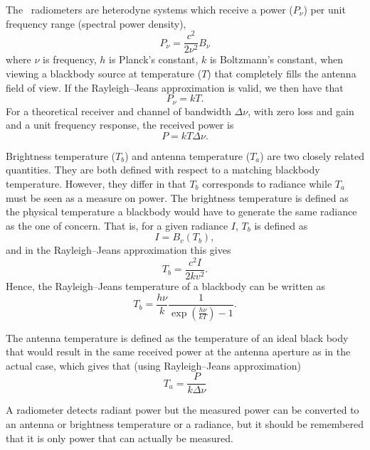 The \smr\ radiometers are heterodyne systems which receive a power (\(P_{\nu}\))
per unit frequency range (spectral power density),
\begin{equation}
P_{\nu} = \frac{c^{2}}{2\nu^{2}}B_{\nu}
\end{equation} 
where \(\nu\) is frequency, \(h\) is Planck's constant, \(k\) is Boltzmann's constant,
when viewing a blackbody source at temperature (\(T\)) that completely
fills the antenna field of view. 
If the Rayleigh--Jeans approximation is valid, we then have that
\begin{equation}
P_{\nu} = kT.
\end{equation}
For a theoretical receiver and channel of bandwidth \(\Delta \nu\), with zero loss and gain 
and a unit frequency response, the received power is
\begin{equation}
 P = kT\Delta \nu.
\end{equation}   

Brightness temperature (\(T_{b}\)) and antenna temperature (\(T_{a}\))
are two closely related quantities. They are both defined with respect to a 
matching blackbody temperature. However, they differ in that \(T_{b}\) corresponds 
to radiance while \(T_{a}\) must be seen as a measure on power.
The brightness temperature is defined as the physical temperature 
a blackbody would have to generate the same radiance as the one of concern.
That is, for a given radiance \(I\), \(T_{b}\) is defined as
\begin{equation}
 I = B_{v}(T_{b}),
\end{equation}
and in the Rayleigh--Jeans approximation this gives
\begin{equation}
 T_{b} = \frac{c^{2}I}{2kv^{2}}.
\end{equation}
Hence, the Rayleigh--Jeans temperature of a blackbody can be written as 
\begin{equation}
 T_{b} = \frac{h\nu}{k}\frac{1}{\exp(\frac{h\nu}{kT})-1}.  
\label{eq:tbrj}
\end{equation}


The antenna temperature is defined as the temperature of an ideal black
body that would result in the same received power at the antenna aperture 
as in the actual case, which gives that (using Rayleigh--Jeans approximation)
\begin{equation}
T_{a} = \frac{P}{k\Delta \nu}
\end{equation}

A radiometer detects radiant power but the measured power can be converted to an
antenna or brightness temperature or a radiance, but it should be
remembered that it is only power that can actually be measured.
 

